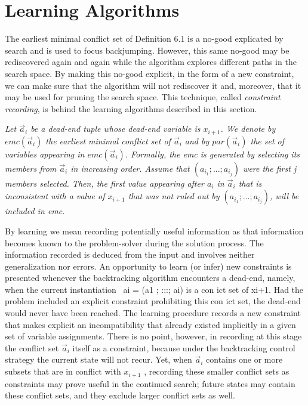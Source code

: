 \documentclass{article}
\begin{document}
\section{Learning Algorithms}
The earliest minimal conflict set of Definition 6.1 is a no-good explicated by
search and is used to focus backjumping. However, this same no-good may be
rediscovered again and again while the algorithm explores different paths in the
search space. By making this no-good explicit, in the form of a new constraint,
we can make sure that the algorithm will not rediscover it and, moreover, that
it may be used for pruning the search space. This technique, called \textit{constraint
recording}, is behind the learning algorithms described in this section. \\
\smallskip
\begin{definition} 
  \textit{Let $\vec{a}_i$ be a dead-end tuple whose dead-end variable is $x_{i+1}$. We denote by $emc(\vec{a}_i)$ the earliest minimal conflict set of $\vec{a}_i$ and by $par(\vec{a}_i)$ the set of variables appearing in $emc(\vec{a}_i)$. Formally, the emc is generated by selecting its members from $\vec{a}_i$ in increasing order.
  Assume that $(a_{i_1} ;...; a_{i_j} )$ were the first j members selected. Then, the first value
  appearing after $a_i$ in $\vec{a}_i$ that is inconsistent with a value of $x_{i+1}$ that was not
  ruled out by $(a_{i_1} ;...; a_{i_j} )$, will be included in emc.}
\end{definition}
By learning we mean recording potentially useful information as that information becomes known to the problem-solver during the solution process. The
information recorded is deduced from the input and involves neither generalization nor errors. An opportunity to learn (or infer) new constraints is presented
whenever the backtracking algorithm encounters a dead-end, namely, when the
current instantiation ~ai = (a1 ; :::; ai) is a con ict set of xi+1. Had the problem
included an explicit constraint prohibiting this con ict set, the dead-end would
never have been reached. The learning procedure records a new constraint that makes explicit an incompatibility that already existed implicitly in a given set
of variable assignments. There is no point, however, in recording at this stage
the conflict set $\vec{a}_i$ itself as a constraint, because under the backtracking control
strategy the current state will not recur. Yet, when $\vec{a}_i$ contains one or more
subsets that are in conflict with $x_{i+1}$ , recording these smaller conflict sets as
constraints may prove useful in the continued search; future states may contain
these conflict sets, and they exclude larger conflict sets as well. \\
\end{document}
